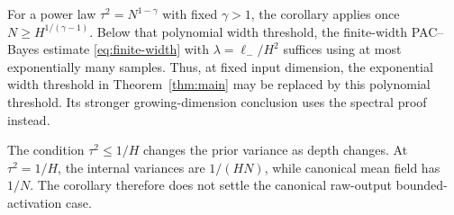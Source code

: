 For a power law $\tau^2=N^{1-\gamma}$ with fixed $\gamma>1$, the corollary applies once $N\ge H^{1/(\gamma-1)}$. Below that polynomial width threshold, the finite-width PAC--Bayes estimate \eqref{eq:finite-width} with $\lambda=\ell_-/H^2$ suffices using at most exponentially many samples. Thus, at fixed input dimension, the exponential width threshold in Theorem~\ref{thm:main} may be replaced by this polynomial threshold. Its stronger growing-dimension conclusion uses the spectral proof instead.

The condition $\tau^2\le1/H$ changes the prior variance as depth changes. At $\tau^2=1/H$, the internal variances are $1/(HN)$, while canonical mean field has $1/N$. The corollary therefore does not settle the canonical raw-output bounded-activation case.
